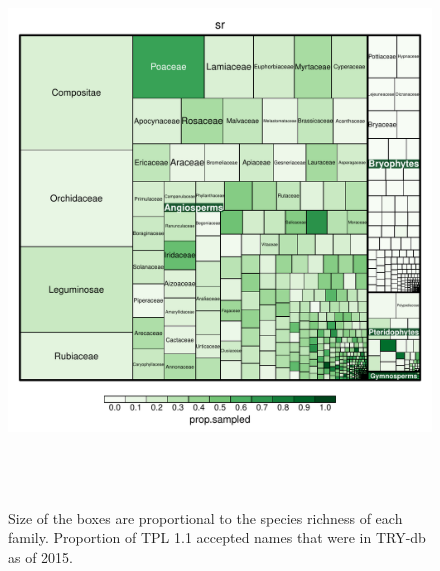 \documentclass[a4paper,11pt]{article}
\begin{document}
\begin{figure}[h!]
\centering
\includegraphics[width=15cm,height=15cm,keepaspectratio]{figures/sampling_in_try_by_family.pdf}
\caption{Size of the boxes are proportional to the species richness of each family.  Proportion of TPL 1.1 accepted names that were in TRY-db as of 2015.  }
\label{fig:try_treemap}
\end{figure}
\clearpage


\end{document}

